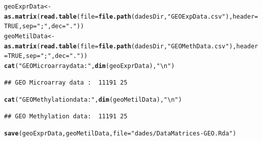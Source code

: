 \documentclass[a4paper,10pt]{article}\usepackage[]{graphicx}\usepackage[]{color}
\makeatletter
\newcommand{\hlnum}[1]{\textcolor[rgb]{0.686,0.059,0.569}{#1}}%
\newcommand{\hlstr}[1]{\textcolor[rgb]{0.192,0.494,0.8}{#1}}%
\newcommand{\hlstd}[1]{\textcolor[rgb]{0.345,0.345,0.345}{#1}}%
\newcommand{\hlkwb}[1]{\textcolor[rgb]{0.69,0.353,0.396}{#1}}%
\newcommand{\hlkwc}[1]{\textcolor[rgb]{0.333,0.667,0.333}{#1}}%
\newcommand{\hlkwd}[1]{\textcolor[rgb]{0.737,0.353,0.396}{\textbf{#1}}}%
\newenvironment{kframe}{%
 \def\at@end@of@kframe{}%
 \ifinner\ifhmode%
  \def\at@end@of@kframe{\end{minipage}}%
  \begin{minipage}{\columnwidth}%
 \fi\fi%
 \def\FrameCommand##1{\hskip\@totalleftmargin \hskip-\fboxsep
 \colorbox{shadecolor}{##1}\hskip-\fboxsep
     \hskip-\linewidth \hskip-\@totalleftmargin \hskip\columnwidth}%
 \MakeFramed {\advance\hsize-\width
   \@totalleftmargin\z@ \linewidth\hsize
   \@setminipage}}%
 {\par\unskip\endMakeFramed%
 \at@end@of@kframe}
\newenvironment{knitrout}{}{} %
\makeatother
\begin{document}
\begin{knitrout}
\color{fgcolor}\begin{kframe}
\begin{alltt}
\hlstd{geoExprData} \hlkwb{<-}  \hlkwd{as.matrix}\hlstd{(}\hlkwd{read.table}\hlstd{(}\hlkwc{file}\hlstd{=}\hlkwd{file.path}\hlstd{(dadesDir,}\hlstr{"GEOExpData.csv"}\hlstd{),} \hlkwc{header}\hlstd{=}\hlnum{TRUE}\hlstd{,} \hlkwc{sep}\hlstd{=}\hlstr{";"}\hlstd{,} \hlkwc{dec}\hlstd{=}\hlstr{"."}\hlstd{))}
\hlstd{geoMetilData} \hlkwb{<-}  \hlkwd{as.matrix}\hlstd{(}\hlkwd{read.table}\hlstd{(}\hlkwc{file}\hlstd{=}\hlkwd{file.path}\hlstd{(dadesDir,}\hlstr{"GEOMethData.csv"}\hlstd{),} \hlkwc{header}\hlstd{=}\hlnum{TRUE}\hlstd{,} \hlkwc{sep}\hlstd{=}\hlstr{";"}\hlstd{,} \hlkwc{dec}\hlstd{=}\hlstr{"."}\hlstd{))}
\hlkwd{cat}\hlstd{(}\hlstr{"GEO Microarray data : "}\hlstd{,} \hlkwd{dim}\hlstd{(geoExprData),} \hlstr{"\textbackslash{}n"}\hlstd{)}
\end{alltt}
\begin{verbatim}
## GEO Microarray data :  11191 25
\end{verbatim}
\begin{alltt}
\hlkwd{cat}\hlstd{(}\hlstr{"GEO Methylation data: "}\hlstd{,} \hlkwd{dim}\hlstd{(geoMetilData),} \hlstr{"\textbackslash{}n"}\hlstd{)}
\end{alltt}
\begin{verbatim}
## GEO Methylation data:  11191 25
\end{verbatim}
\begin{alltt}
\hlkwd{save}\hlstd{(geoExprData, geoMetilData,} \hlkwc{file}\hlstd{=}\hlstr{"dades/DataMatrices-GEO.Rda"}\hlstd{)}
\end{alltt}
\end{kframe}
\end{knitrout}
\end{document}
